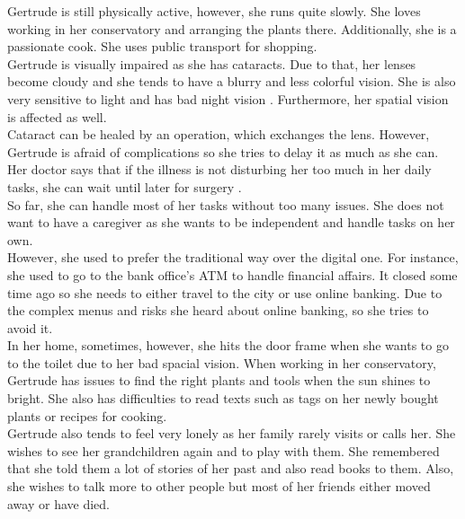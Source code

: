 \documentclass[plainarticle,zihtitle,english,final,hyperref,utf8]{zihpub}
\begin{document}
Gertrude is still physically active, however, she runs quite slowly. She loves working in her conservatory and arranging the plants there. Additionally, she is a passionate cook. She uses public transport for shopping.\\
\newline
Gertrude is visually impaired as she has cataracts. Due to that, her lenses become cloudy and she tends to have a blurry and less colorful vision. She is also very sensitive to light and has bad night vision \cite{aao19}. 
Furthermore, her spatial vision is affected as well.\\
Cataract can be healed by an operation, which exchanges the lens. However, Gertrude is afraid of complications so she tries to delay it as much as she can. Her doctor says that if the illness is not disturbing her too much in her daily tasks, she can wait until later for surgery \cite{iqwig19}.\\
So far, she can handle most of her tasks without too many issues. She does not want to have a caregiver as she wants to be independent and handle tasks on her own.\\
However, she used to prefer the traditional way over the digital one. For instance, she used to go to the bank office's ATM to handle financial affairs. It closed some time ago so she needs to either travel to the city or use online banking. Due to the complex menus and risks she heard about online banking, so she tries to avoid it.\\
\newline
In her home, sometimes, however, she hits the door frame when she wants to go to the toilet due to her bad spacial vision. 
When working in her conservatory, Gertrude has issues to find the right plants and tools when the sun shines to bright. She also has difficulties to read texts such as tags on her newly bought plants or recipes for cooking.\\
Gertrude also tends to feel very lonely as her family rarely visits or calls her. She wishes to see her grandchildren again and to play with them. She remembered that she told them a lot of stories of her past and also read books to them. Also, she wishes to talk more to other people but most of her friends either moved away or have died.
\end{document}
